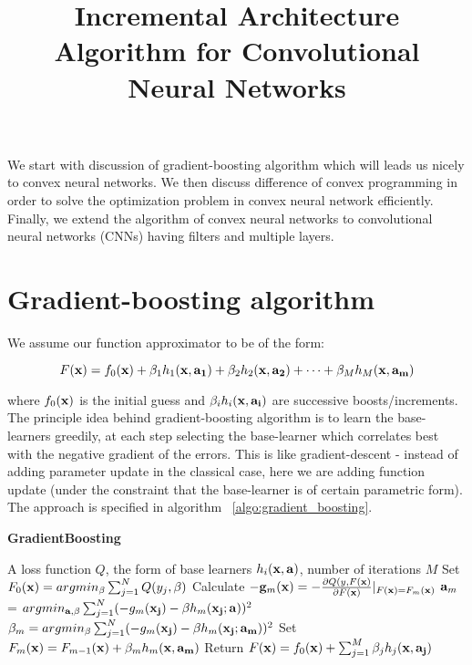 \documentclass{article}
\title{Incremental Architecture Algorithm for Convolutional Neural Networks}
\begin{document}
\maketitle

We start with discussion of gradient-boosting algorithm which will leads us nicely to convex neural networks. We then discuss difference of convex programming in order to solve the optimization problem in convex neural network efficiently. Finally, we extend the algorithm of convex neural networks to convolutional neural networks (CNNs) having filters and multiple layers.

\section{Gradient-boosting algorithm}
\label{sec:grad_boosting}
We assume our function approximator to be of the form:

\begin{equation}
	F({\bf x}) = f_0({\bf x}) + \beta_1 h_1({\bf x, a_1}) + \beta_2 h_2({\bf x, a_2}) + \dots + \beta_M h_M({\bf x, a_m})  
\end{equation}

where $f_0({\bf x})$ is the initial guess and $\beta_i h_i({\bf x, a_i})$ are successive boosts/increments. The principle idea behind gradient-boosting algorithm is to learn the base-learners greedily, at each step selecting the base-learner which correlates best with the negative gradient of the errors. This is like gradient-descent - instead of adding parameter update in the classical case, here we are adding function update (under the constraint that the base-learner is of certain parametric form). The approach is specified in algorithm ~\ref{algo:gradient_boosting}.

\begin{algorithm}
\caption{{\bf GradientBoosting} \cite{friedman2001greedy}}\label{algo:gradient_boosting}
\begin{algorithmic}[1]
 A loss function $Q$, the form of base learners $h_{i}({\bf x, a})$, number of iterations $M$
\STATE Set $F_0({\bf x}) = argmin_{\beta}  \sum_{j = 1}^{N} Q(y_j, \beta)$
\STATE Calculate $-{\bf g}_m({\bf x}) = - \frac{\partial Q(y, F{\bf(x)}}{\partial F{\bf(x)}}|_{F({\bf x}) = F_m({\bf x})}$
\STATE ${\bf a}_m$ = $argmin_{{\bf a}, \beta} \sum_{j = 1}^{N} (- g_m({\bf x_j}) - \beta h_m({\bf x_j;a}))^2$
\STATE $\beta_m = argmin_{\beta}  \sum_{j = 1}^{N} (- g_m({\bf x_j}) - \beta h_m({\bf x_j;a_m}))^2$
\STATE Set $F_m({\bf x}) = F_{m - 1}({\bf x}) + \beta_m h_m({\bf x, a_m})$
\ENDFOR
\STATE Return $F({\bf x}) = f_0({\bf x}) + \sum_{j = 1}^{M} \beta_j h_j({\bf x, a_j})$
\end{algorithmic}
\end{algorithm}
\end{document}
